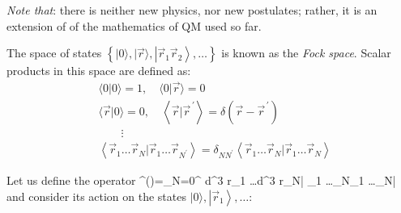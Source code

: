 \documentclass[12pt]{article}
\begin{document}
\emph{Note that}: there is neither new physics, nor new
postulates; rather, it is an extension of
of the mathematics of QM used so far.

The space of states $\left\{|0\rangle,|\vec{r}\rangle,\left|\vec{r}_{1} \vec{r}_{2}\right\rangle, \ldots\right\}$ is known
as the \emph{Fock space}. Scalar products in this space
are defined as:
\begin{align}
&\langle 0 | 0\rangle=1, 
\quad\langle 0 | \vec{r}\rangle=0\\
&\langle\vec{r} | 0\rangle=0,
\quad\left\langle\vec{r} | \vec{r}^{\,\prime}\right\rangle=\delta\left(\vec{r}-\vec{r}^{\,\prime}\right)\\
&\quad\quad\vdots\nonumber\\
&\left\langle\vec{r}_{1} \ldots \vec{r}_{N} | \vec{r}_{1} \ldots \vec{r}_{N^{\prime}}\right\rangle=\delta_{NN^{\prime}}\left\langle\vec{r}_{1} \ldots \vec{r}_{N} | \vec{r}_{1} \ldots \vec{r}_{N}\right\rangle\label{eq:g29}
\end{align}

Let us define the operator
\be
\hat{\psi}^{\dagger}()=\sum_{N=0}^{\infty}  \int d^{3} r_{1} \ldots d^{3} r_{N}\left| _{1} \ldots {}_{N}\right\rangle\left\langle{}_{1} \ldots {}_{N}\right|
\label{eq:g30}
\ee
and consider its action on the states $|0\rangle,\left|\vec{r}_{1}\right\rangle, \ldots$:
\end{document}
